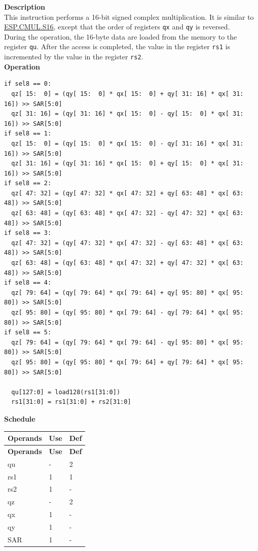 \textbf{Description}\\
This instruction performs a 16-bit signed complex multiplication. It is similar to \hyperref[instruction:ESPCMULS16]{ESP.CMUL.S16}, except that the order of registers \lstinline{qx} and \lstinline{qy} is reversed.\\
During the operation, the 16-byte data are loaded from the memory to the register \lstinline{qu}. After the access is completed, the value in the register \lstinline{rs1} is incremented by the value in the register \lstinline{rs2}.\\
\textbf{Operation}
\begin{lstlisting}
if sel8 == 0:
  qz[ 15:  0] = (qy[ 15:  0] * qx[ 15:  0] + qy[ 31: 16] * qx[ 31: 16]) >> SAR[5:0]
  qz[ 31: 16] = (qy[ 31: 16] * qx[ 15:  0] - qy[ 15:  0] * qx[ 31: 16]) >> SAR[5:0]
if sel8 == 1:
  qz[ 15:  0] = (qy[ 15:  0] * qx[ 15:  0] - qy[ 31: 16] * qx[ 31: 16]) >> SAR[5:0]
  qz[ 31: 16] = (qy[ 31: 16] * qx[ 15:  0] + qy[ 15:  0] * qx[ 31: 16]) >> SAR[5:0]
if sel8 == 2:
  qz[ 47: 32] = (qy[ 47: 32] * qx[ 47: 32] + qy[ 63: 48] * qx[ 63: 48]) >> SAR[5:0]
  qz[ 63: 48] = (qy[ 63: 48] * qx[ 47: 32] - qy[ 47: 32] * qx[ 63: 48]) >> SAR[5:0]
if sel8 == 3:
  qz[ 47: 32] = (qy[ 47: 32] * qx[ 47: 32] - qy[ 63: 48] * qx[ 63: 48]) >> SAR[5:0]
  qz[ 63: 48] = (qy[ 63: 48] * qx[ 47: 32] + qy[ 47: 32] * qx[ 63: 48]) >> SAR[5:0]
if sel8 == 4:
  qz[ 79: 64] = (qy[ 79: 64] * qx[ 79: 64] + qy[ 95: 80] * qx[ 95: 80]) >> SAR[5:0]
  qz[ 95: 80] = (qy[ 95: 80] * qx[ 79: 64] - qy[ 79: 64] * qx[ 95: 80]) >> SAR[5:0]
if sel8 == 5:
  qz[ 79: 64] = (qy[ 79: 64] * qx[ 79: 64] - qy[ 95: 80] * qx[ 95: 80]) >> SAR[5:0]
  qz[ 95: 80] = (qy[ 95: 80] * qx[ 79: 64] + qy[ 79: 64] * qx[ 95: 80]) >> SAR[5:0]

  qu[127:0] = load128(rs1[31:0])
  rs1[31:0] = rs1[31:0] + rs2[31:0]
\end{lstlisting}

\textbf{Schedule}\\
\begin{longtable}[c]{|l|l|l|}
    \hline
    \rowcolor{lightgray}
    \textbf{Operands} & \textbf{Use} & \textbf{Def} \\\hline
    \endfirsthead
    \hline
    \rowcolor{lightgray}
     \textbf{Operands} & \textbf{Use} & \textbf{Def} \\\hline
    \endhead
    \hline
    \endfoot

  qu & - & 2 \\\hline
  rs1 & 1 & 1 \\\hline
  rs2 & 1 & - \\\hline
  qz & - & 2 \\\hline
  qx & 1 & - \\\hline
  qy & 1 & - \\\hline
  SAR & 1 & -

\end{longtable}

